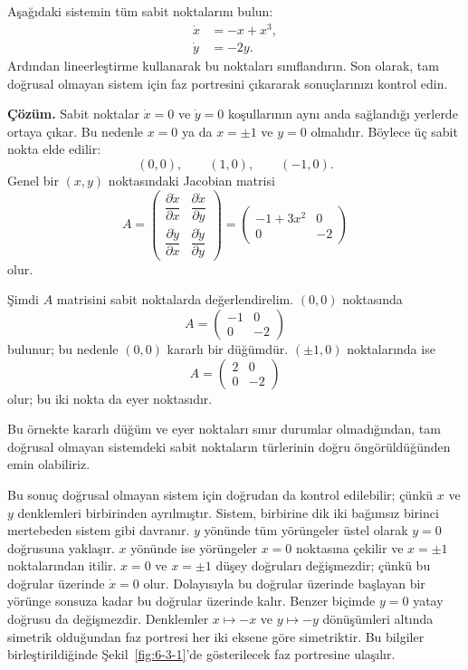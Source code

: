 \begin{justify}
Aşağıdaki sistemin tüm sabit noktalarını bulun:
\begin{align}
\dot{x} &= -x+x^3,\\
\dot{y} &= -2y.
\end{align}
Ardından lineerleştirme kullanarak bu noktaları sınıflandırın. Son olarak, tam doğrusal olmayan sistem için faz portresini çıkararak sonuçlarınızı kontrol edin.

\textbf{Çözüm.} Sabit noktalar $\dot{x}=0$ ve $\dot{y}=0$ koşullarının aynı anda sağlandığı yerlerde ortaya çıkar. Bu nedenle $x=0$ ya da $x=\pm1$ ve $y=0$ olmalıdır. Böylece üç sabit nokta elde edilir:
\begin{equation}
(0,0), \qquad (1,0), \qquad (-1,0).
\end{equation}
Genel bir $(x,y)$ noktasındaki Jacobian matrisi
\begin{equation}
A=\begin{pmatrix}
\dfrac{\partial \dot{x}}{\partial x} & \dfrac{\partial \dot{x}}{\partial y}\\[0.3cm]
\dfrac{\partial \dot{y}}{\partial x} & \dfrac{\partial \dot{y}}{\partial y}
\end{pmatrix}
=
\begin{pmatrix}
-1+3x^2 & 0\\
0 & -2
\end{pmatrix}
\end{equation}
olur.

Şimdi $A$ matrisini sabit noktalarda değerlendirelim. $(0,0)$ noktasında
\begin{equation}
A=\begin{pmatrix}-1&0\\0&-2\end{pmatrix}
\end{equation}
bulunur; bu nedenle $(0,0)$ kararlı bir düğümdür. $(\pm1,0)$ noktalarında ise
\begin{equation}
A=\begin{pmatrix}2&0\\0&-2\end{pmatrix}
\end{equation}
olur; bu iki nokta da eyer noktasıdır.

Bu örnekte kararlı düğüm ve eyer noktaları sınır durumlar olmadığından, tam doğrusal olmayan sistemdeki sabit noktaların türlerinin doğru öngörüldüğünden emin olabiliriz.

Bu sonuç doğrusal olmayan sistem için doğrudan da kontrol edilebilir; çünkü $x$ ve $y$ denklemleri birbirinden ayrılmıştır. Sistem, birbirine dik iki bağımsız birinci mertebeden sistem gibi davranır. $y$ yönünde tüm yörüngeler üstel olarak $y=0$ doğrusuna yaklaşır. $x$ yönünde ise yörüngeler $x=0$ noktasına çekilir ve $x=\pm1$ noktalarından itilir. $x=0$ ve $x=\pm1$ düşey doğruları değişmezdir; çünkü bu doğrular üzerinde $\dot{x}=0$ olur. Dolayısıyla bu doğrular üzerinde başlayan bir yörünge sonsuza kadar bu doğrular üzerinde kalır. Benzer biçimde $y=0$ yatay doğrusu da değişmezdir. Denklemler $x\mapsto -x$ ve $y\mapsto -y$ dönüşümleri altında simetrik olduğundan faz portresi her iki eksene göre simetriktir. Bu bilgiler birleştirildiğinde Şekil~\ref{fig:6-3-1}'de gösterilecek faz portresine ulaşılır.


\end{justify}
